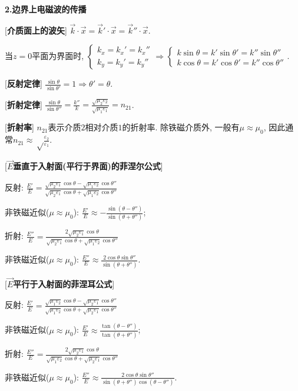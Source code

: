 \large 
\begin{center}
 \textbf{2.边界上电磁波的传播}
\end{center}

[\textbf{介质面上的波矢}] $\vec k\cdot\vec x=\vec k'\cdot\vec x=\vec k''\cdot\vec x$.\par
\qquad 当$z=0$平面为界面时, $\begin{cases}k_x=k_x'=k_x''\\ k_y=k_y'=k_y''\end{cases}\Rightarrow \begin{cases}k\sin\theta=k'\sin{\theta'}=k''\sin{\theta''}\\ k\cos{\theta}=k'\cos{\theta'}=k''\cos{\theta''}\end{cases}$.\par

[\textbf{反射定律}] $\frac{\sin{\theta}}{\sin{\theta '}}=1\Rightarrow \theta'=\theta$.\par

[\textbf{折射定律}] $\frac{\sin\theta}{\sin\theta''}=\frac{k''}{k}=\frac{\sqrt{\mu_2\varepsilon_2}}{\sqrt{\mu_1\varepsilon_1}}=n_{21}$.\par

[\textbf{折射率}] $n_{21}$表示介质$2$相对介质$1$的折射率. 除铁磁介质外, 一般有$\mu\approx \mu_0$, 因此通常$n_{21}\approx\sqrt\frac{\varepsilon_2}{\varepsilon_1}$.\par

[\textbf{$\vec E$垂直于入射面(平行于界面)的菲涅尔公式}]\par
\qquad 反射: $\frac{E'}{E}=\frac{\sqrt{\mu_2\varepsilon_1}\cos\theta-\sqrt{\mu_1\varepsilon_2}\cos\theta''}{\sqrt{\mu_2\varepsilon_1}\cos\theta+\sqrt{\mu_1\varepsilon_2}\cos\theta''}$\par
\qquad \qquad 非铁磁近似($\mu\approx \mu_0$): $\frac{E'}{E}\approx -\frac{\sin{(\theta-\theta'')}}{\sin{(\theta+\theta'')}}$;\par
\qquad 折射: $\frac{E''}{E}=\frac{2\sqrt{\mu_2\varepsilon_1}\cos\theta}{\sqrt{\mu_2\varepsilon_1}\cos\theta+\sqrt{\mu_1\varepsilon_2}\cos\theta''}$\par
\qquad \qquad 非铁磁近似($\mu\approx \mu_0$): $\frac{E''}{E}\approx \frac{2\cos\theta\sin\theta''}{\sin{(\theta+\theta'')}}$.\par

[\textbf{$\vec E$平行于入射面的菲涅耳公式}]\par
\qquad 反射: $\frac{E'}{E}=\frac{\sqrt{\mu_1\varepsilon_2}\cos\theta-\sqrt{\mu_2\varepsilon_1}\cos\theta''}{\sqrt{\mu_1\varepsilon_2}\cos\theta+\sqrt{\mu_2\varepsilon_1}\cos\theta''}$\par
\qquad \qquad 非铁磁近似($\mu\approx \mu_0$): $\frac{E'}{E}\approx \frac{\tan{(\theta-\theta'')}}{\tan{(\theta+\theta'')}}$;\par
\qquad 折射: $\frac{E''}{E}=\frac{2\sqrt{\mu_2\varepsilon_1}\cos\theta}{\sqrt{\mu_1\varepsilon_2}\cos\theta+\sqrt{\mu_2\varepsilon_1}\cos\theta''}$\par
\qquad \qquad 非铁磁近似($\mu\approx \mu_0$): $\frac{E''}{E}\approx \frac{2\cos\theta\sin\theta''}{\sin{(\theta+\theta'')}\cos{(\theta-\theta'')}}$.\par

